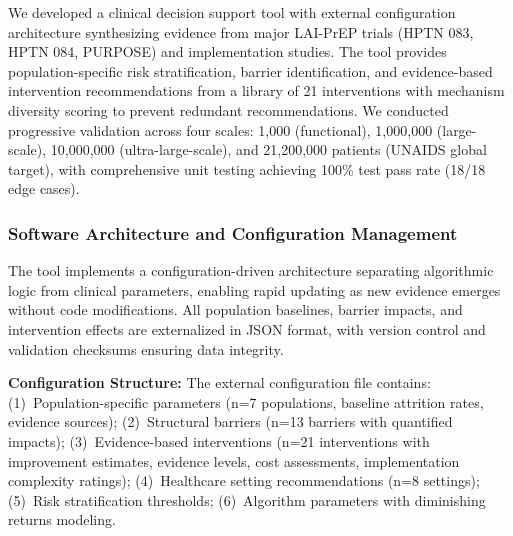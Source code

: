 


We developed a clinical decision support tool with external configuration architecture synthesizing evidence from major LAI-PrEP trials (HPTN 083, HPTN 084, PURPOSE) and implementation studies. The tool provides population-specific risk stratification, barrier identification, and evidence-based intervention recommendations from a library of 21 interventions with mechanism diversity scoring to prevent redundant recommendations. We conducted progressive validation across four scales: 1,000 (functional), 1,000,000 (large-scale), 10,000,000 (ultra-large-scale), and 21,200,000 patients (UNAIDS global target), with comprehensive unit testing achieving 100\% test pass rate (18/18 edge cases).



\subsubsection{Software Architecture and Configuration Management}

The tool implements a configuration-driven architecture separating algorithmic logic from clinical parameters, enabling rapid updating as new evidence emerges without code modifications. All population baselines, barrier impacts, and intervention effects are externalized in JSON format, with version control and validation checksums ensuring data integrity.

\textbf{Configuration Structure:} The external configuration file contains: (1)~Population-specific parameters (n=7 populations, baseline attrition rates, evidence sources); (2)~Structural barriers (n=13 barriers with quantified impacts); (3)~Evidence-based interventions (n=21 interventions with improvement estimates, evidence levels, cost assessments, implementation complexity ratings); (4)~Healthcare setting recommendations (n=8 settings); (5)~Risk stratification thresholds; (6)~Algorithm parameters with diminishing returns modeling.

